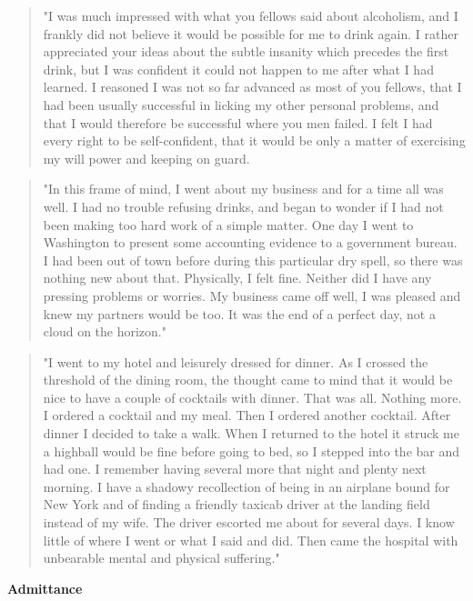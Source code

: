 \begin{biblechatper}
\begin{biblechatper}
\begin{biblechatper}
\begin{biblechatper}
\begin{biblechatper}
\begin{biblechatper}
\begin{biblechatper}
\begin{biblechatper}
\begin{biblechatper}
\begin{biblechatper}
\begin{biblechatper}
\begin{biblechatper}
\begin{biblechatper}
\begin{quote}
"I was much impressed with what you fellows said about alcoholism, 
and I frankly did not believe it would be possible for me to drink again. 
I rather appreciated your ideas about the subtle insanity which precedes the first drink, 
but I was confident it could not happen to me after what I had learned. 
I reasoned I was not so far advanced as most of you fellows, 
that I had been usually successful in licking my other personal problems, 
and that I would therefore be successful where you men failed. 
I felt I had every right to be self-confident, 
that it would be only a matter of exercising my will power and keeping on guard.
\end{quote}

\begin{quote}
"In this frame of mind, I went about my business and for a time all was well. 
I had no trouble refusing drinks, 
and began to wonder if I had not been making too hard work of a simple matter. 
One day I went to Washington to present some accounting evidence to a government bureau. 
I had been out of town before during this particular dry spell, 
so there was nothing new about that. 
Physically, I felt fine. 
Neither did I have any pressing problems or worries. 
My business came off well, I was pleased and knew my partners would be too. 
It was the end of a perfect day, not a cloud on the horizon."
\end{quote}


\begin{quote}
"I went to my hotel and leisurely dressed for dinner. 
As I crossed the threshold of the dining room, 
the thought came to mind that it would be nice to have a couple of cocktails with dinner. 
That was all. 
Nothing more. 
I ordered a cocktail and my meal. 
Then I ordered another cocktail. 
After dinner I decided to take a walk. 
When I returned to the hotel it struck me a highball would be fine before going to bed, 
so I stepped into the bar and had one. 
I remember having several more that night and plenty next morning. 
I have a shadowy recollection of being in an airplane bound for New York 
and of finding a friendly taxicab driver at the landing field instead of my wife. 
The driver escorted me about for several days. 
I know little of where I went or what I said and did. 
Then came the hospital with unbearable mental and physical suffering."
\end{quote}


\textbf{Admittance}


\end{biblechatper}
\end{biblechatper}
\end{biblechatper}
\end{biblechatper}
\end{biblechatper}
\end{biblechatper}
\end{biblechatper}
\end{biblechatper}
\end{biblechatper}
\end{biblechatper}
\end{biblechatper}
\end{biblechatper}
\end{biblechatper}
